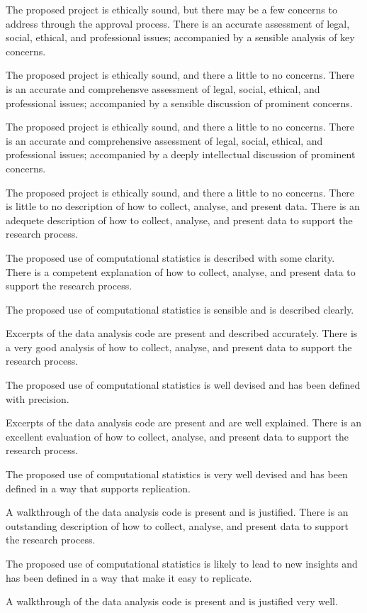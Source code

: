 \begin{markingrubric}
        \par		The proposed project is ethically sound, but there may be a few concerns to address through the approval process.
        \grade 		There is an accurate assessment of legal, social, ethical, and professional issues; accompanied by a sensible analysis of key concerns.
        \par		The proposed project is ethically sound, and there a little to no concerns.
        \grade 		There is an accurate and comprehensve assessment of legal, social, ethical, and professional issues; accompanied by a sensible discussion of prominent concerns.
        \par		The proposed project is ethically sound, and there a little to no concerns.
        \grade 		There is an accurate and comprehensive assessment of legal, social, ethical, and professional issues; accompanied by a deeply intellectual discussion of prominent concerns.
        \par		The proposed project is ethically sound, and there a little to no concerns.
%  
        \grade\fail 	There is little to no description of how to collect, analyse, and present data.
        \grade 		There is an adequete description of how to collect, analyse, and present data to support the research process.
         \par		The proposed use of computational statistics is described with some clarity.        
        \grade 		There is a competent explanation of how to collect, analyse, and present data to support the research process.
         \par		The proposed use of computational statistics is sensible and is described clearly.         
        \par		Excerpts of the data analysis code are present and described accurately.                 
        \grade 		There is a very good analysis of how to collect, analyse, and present data to support the research process.
         \par		The proposed use of computational statistics is well devised and has been defined with precision.                  
        \par		Excerpts of the data analysis code are present and are well explained.   
        \grade 		There is an excellent evaluation of how to collect, analyse, and present data to support the research process.
         \par		The proposed use of computational statistics is very well devised and has been defined in a way that supports replication.      
        \par		A walkthrough of the data analysis code is present and is justified.   
        \grade 		There is an outstanding description of how to collect, analyse, and present data to support the research process.
         \par		The proposed use of computational statistics is likely to lead to new insights and has been defined in a way that make it easy to replicate.        
        \par		A walkthrough of the data analysis code is present and is justified very well. 
\end{markingrubric}

